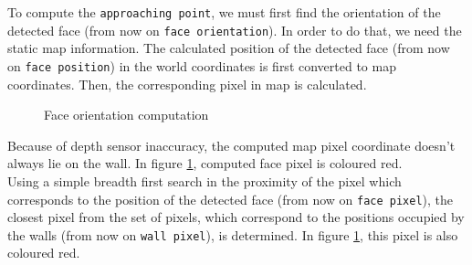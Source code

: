 \documentclass[12pt,a4paper]{article}
\begin{document}
	To compute the \texttt{approaching point}, we must first find the orientation of the detected face (from now on \texttt{face orientation}). In order to do that, we need the static map information.
	The calculated position of the detected face (from now on \texttt{face position}) in the world coordinates is first converted to map coordinates. Then, the corresponding pixel in map is calculated. \\
	
	\begin{figure}[h]
		\centering
		\caption{Face orientation computation}
		\label{fig:orientation_computation}
	\end{figure}
	
	Because of depth sensor inaccuracy, the computed map pixel coordinate doesn't always lie on the wall. In figure \ref{fig:orientation_computation}, computed face pixel is coloured red. \\ 
	
	Using a simple breadth first search in the proximity of the pixel which corresponds to the position of the detected face (from now on \texttt{face pixel}), the closest pixel from the set of pixels, which correspond to the positions occupied by the walls (from now on \texttt{wall pixel}), is determined. In figure \ref{fig:orientation_computation}, this pixel is also coloured red. \\
	
\end{document}
